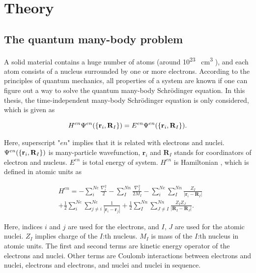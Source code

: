 \documentclass[a4paper, 12pt, titlepage,oneside,drop]{kthesis}
\begin{document}
\section{Theory}
\label{ch:dft}

\subsection{The quantum many-body problem}
\label{ch:mb}

\noindent A solid material contains a huge number of atoms (around 10\textsuperscript{23} \si{\per\cubic\centi\metre} ), and each atom consists of a nucleus surrounded by one or more electrons. 
According to the principles of quantum mechanics, all properties of a system are known if one can figure out a way to solve 
the quantum many-body Schrödinger equation. In this thesis, the time-independent many-body Schrödinger equation is only considered, which is given as

\begin{equation}\label{ssth}
 H^{en} {\Psi^{en}(\{ {\textbf r}_{i}, {\textbf R}_{I} \})} = {E^{en}} {\Psi^{en}(\{ {\textbf r}_{i}, {\textbf R}_{I} \})}.
\end{equation}


Here, superscript "$en$" implies that it is related with electrons and nuclei. ${\Psi^{en}(\{ {\textbf r}_{i}, {\textbf R}_{I} \})}$ is many-particle wavefunction, $\textbf{r}_{i}$ 
and $\textbf{R}_{I}$ stands for coordinators of electron and nucleus. $E^{en}$ is total energy of system. $H^{en}$ is Hamiltonian \cite{martin2004electronic}, which is defined in atomic units as

\begin{equation}\label{sth}\begin{split}
& H^{en} = - \sum\limits_i^{Ne}   \frac{{{\nabla}_{{i}}^{2}}}{2} - \sum\limits_I^{Nn} \frac{{{\nabla}_{{I}}^{2}}}{2 M_{I}}  - \sum\limits_i^{Ne} \sum\limits_I^{Nn} \frac{Z_{I}}{|\textbf{r}_{i}-\textbf{R}_{I}|} \\
& + \frac{1}{2} \sum\limits_i^{Ne} \sum\limits_{j \neq i}^{Ne} \frac{1}{ |\textbf{r}_{i}-\textbf{r}_{j}|} + \frac{1}{2} \sum\limits_I^{Nn} \sum\limits_{J \neq I}^{Nn} \frac{Z_{I} Z_{J}\ }{|\textbf{R}_{I}-\textbf{R}_{J}|}.
\end{split}\end{equation}

Here, indices $i$ and $j$ are used for the electrons, and $I$, $J$ are used for the atomic nuclei. $Z_I$ implies charge of the $I$:th nucleus.
$M_I$ is mass of the $I$:th nucleus in atomic units. The first and second terms are kinetic energy operator of the electrons and nuclei.
Other terms are Coulomb interactions between electrons and nuclei, electrons and electrons, and nuclei and nuclei in sequence.
\end{document}
